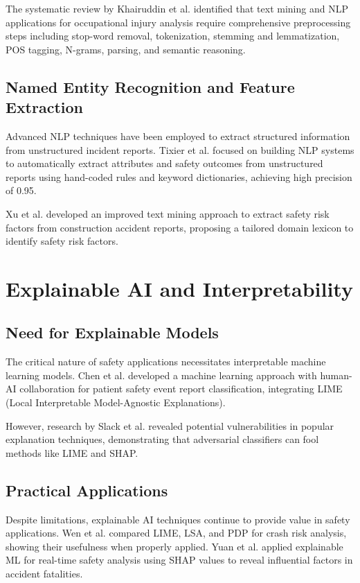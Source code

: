 \documentclass[11pt, titlepage, bibliography=totoc]{scrreprt}
\begin{document}
The systematic review by Khairuddin et al. \cite{khairuddin2022} identified that text mining and NLP applications for occupational injury analysis require comprehensive preprocessing steps including stop-word removal, tokenization, stemming and lemmatization, POS tagging, N-grams, parsing, and semantic reasoning.

\subsection{Named Entity Recognition and Feature Extraction}
Advanced NLP techniques have been employed to extract structured information from unstructured incident reports. Tixier et al. \cite{tixier2016} focused on building NLP systems to automatically extract attributes and safety outcomes from unstructured reports using hand-coded rules and keyword dictionaries, achieving high precision of 0.95.

Xu et al. \cite{xu2021} developed an improved text mining approach to extract safety risk factors from construction accident reports, proposing a tailored domain lexicon to identify safety risk factors.

\section{Explainable AI and Interpretability}

\subsection{Need for Explainable Models}
The critical nature of safety applications necessitates interpretable machine learning models. Chen et al. \cite{chen2024} developed a machine learning approach with human-AI collaboration for patient safety event report classification, integrating LIME (Local Interpretable Model-Agnostic Explanations).

However, research by Slack et al. \cite{slack2020} revealed potential vulnerabilities in popular explanation techniques, demonstrating that adversarial classifiers can fool methods like LIME and SHAP.

\subsection{Practical Applications}
Despite limitations, explainable AI techniques continue to provide value in safety applications. Wen et al. \cite{wen2022} compared LIME, LSA, and PDP for crash risk analysis, showing their usefulness when properly applied. Yuan et al. \cite{yuan2022} applied explainable ML for real-time safety analysis using SHAP values to reveal influential factors in accident fatalities.
\end{document}
